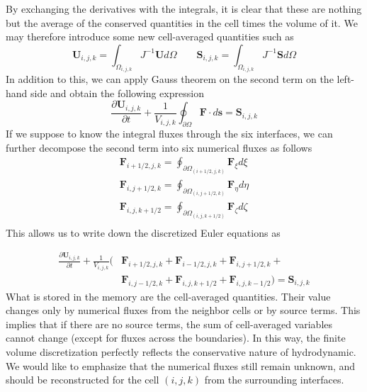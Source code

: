 By exchanging the derivatives with the integrals, it is clear that these are nothing but the average of the conserved quantities in the cell times the volume of it. We may therefore introduce some new cell-averaged quantities such as 
\begin{equation}
\mathbf{U}_{i, j, k} = \int_{\Omega_{i, j, k}} J^{-1} \mathbf{U} d \Omega \qquad \mathbf{S}_{i, j, k} = \int_{\Omega_{i, j, k}} J^{-1} \mathbf{S} d \Omega
\end{equation}
In addition to this, we can apply Gauss theorem on the second term on the left-hand side and obtain the following expression
\begin{equation}
	\frac{\partial \mathbf{U}_{i, j, k}}{\partial t} + \frac{1}{V_{i, j, k}} \oint_{\partial \Omega} \mathbf{F} \cdot d \mathbf{s} = \mathbf{S}_{i, j, k}
\end{equation}
If we suppose to know the integral fluxes through the six interfaces, we can further decompose the second term into six numerical fluxes as follows
\begin{equation}
\begin{split}
	\mathbf{F}_{i+ 1/2, j, k} = \oint_{\partial \Omega_{(i + 1/2, j, k)}} \mathbf{F}_{\xi} d \xi \\
	\mathbf{F}_{i, j + 1/2, k} = \oint_{\partial \Omega_{(i , j + 1/2, k)}} \mathbf{F}_{\eta} d \eta \\
	\mathbf{F}_{i, j, k + 1/2} = \oint_{\partial \Omega_{(i , j, k + 1/2)}} \mathbf{F}_{\zeta} d \zeta \\
\end{split}
\end{equation}
This allows us to write down the discretized Euler equations as 

\begin{equation}
\begin{split}
	\frac{\partial \mathbf{U}_{i, j, k}}{\partial t} + \frac{1}{V_{i, j, k}} ( & \mathbf{F}_{i + 1/2, j, k} + \mathbf{F}_{i - 1/2, j, k} +\mathbf{F}_{i , j + 1/2, k} + \\
	& \mathbf{F}_{i , j - 1/2, k} +  \mathbf{F}_{i , j, k + 1/2} + \mathbf{F}_{i , j, k - 1/2}) = \mathbf{S}_{i, j, k}
\end{split}
\end{equation}
What is stored in the memory are the cell-averaged quantities. Their value changes only by numerical fluxes from the neighbor cells or by source terms. This implies that if there are no source terms, the sum of cell-averaged variables cannot change (except for fluxes across the boundaries). In this way, the finite volume discretization perfectly reflects the conservative nature of hydrodynamic. We would like to emphasize that the numerical fluxes still remain unknown, and should be reconstructed for the cell $(i, j, k)$ from the surrounding interfaces. 

